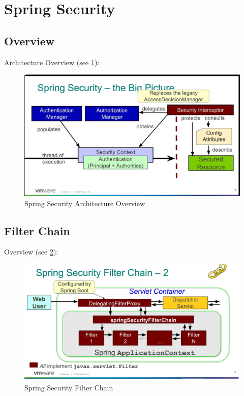 \documentclass{scrartcl}
\begin{document}
\section{Spring Security}
\subsection{Overview}

Architecture Overview (see \ref{fig:spring-security}):

\begin{figure}[h]
    \centering
    \includegraphics[width=1\linewidth]{spring-security}
    \caption{Spring Security Architecture Overview}
    \label{fig:spring-security}
\end{figure}

\subsection{Filter Chain}

Overview (see \ref{fig:filter-chain}):

\begin{figure}
    \centering
    \includegraphics[width=1\linewidth]{filter-chain}
    \caption{Spring Security Filter Chain}
    \label{fig:filter-chain}
\end{figure}
\end{document}
